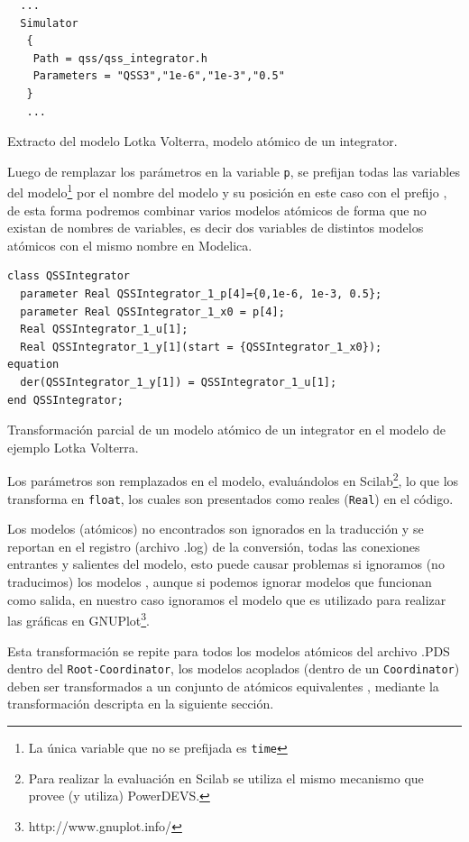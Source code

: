 \begin{listing}[H]
\begin{verbatim}
  ...
  Simulator
   {
    Path = qss/qss_integrator.h
    Parameters = "QSS3","1e-6","1e-3","0.5"
   }
   ...
\end{verbatim}
\label{lst:qssint.pds}
\caption{Extracto del modelo Lotka Volterra, modelo atómico de un integrator.}
\end{listing}

        Luego de remplazar los parámetros en la variable \texttt{p}, se prefijan todas las variables del modelo\footnote{La única variable que no se prefijada 
        es \texttt{time}} por el nombre del modelo y su posición en este caso con el prefijo 
        , de esta forma podremos combinar varios modelos atómicos de forma que no existan  de nombres de variables,
        es decir dos variables de distintos modelos atómicos con el mismo nombre en Modelica. 

\begin{listing}[H]
\begin{verbatim}
class QSSIntegrator
  parameter Real QSSIntegrator_1_p[4]={0,1e-6, 1e-3, 0.5};
  parameter Real QSSIntegrator_1_x0 = p[4];
  Real QSSIntegrator_1_u[1];
  Real QSSIntegrator_1_y[1](start = {QSSIntegrator_1_x0});
equation
  der(QSSIntegrator_1_y[1]) = QSSIntegrator_1_u[1];
end QSSIntegrator;
\end{verbatim}
\caption{Transformación parcial de un modelo atómico de un integrator en el modelo de ejemplo Lotka Volterra.}
\end{listing}

        Los parámetros son remplazados en el modelo, evaluándolos en Scilab\footnote{Para realizar la evaluación en Scilab se utiliza el mismo mecanismo que 
        provee (y utiliza) PowerDEVS.}, lo que los transforma en \texttt{float}, los cuales son presentados como reales (\texttt{Real}) en el código.

        Los modelos (atómicos) no encontrados son ignorados en la traducción y se reportan en el registro (archivo .log) de la conversión, todas
	las conexiones entrantes y salientes del modelo, esto puede causar problemas si ignoramos (no traducimos) los modelos ,
	aunque si podemos ignorar modelos que funcionan como salida, en nuestro caso ignoramos el modelo que es utilizado para realizar las gráficas
	en GNUPlot\footnote{http://www.gnuplot.info/}.

        Esta transformación se repite para todos los modelos atómicos del archivo .PDS dentro del \texttt{Root-Coordinator}, los modelos acoplados 
        (dentro de un \texttt{Coordinator}) deben ser transformados a un conjunto de atómicos equivalentes , mediante la transformación
	descripta en la siguiente sección.

